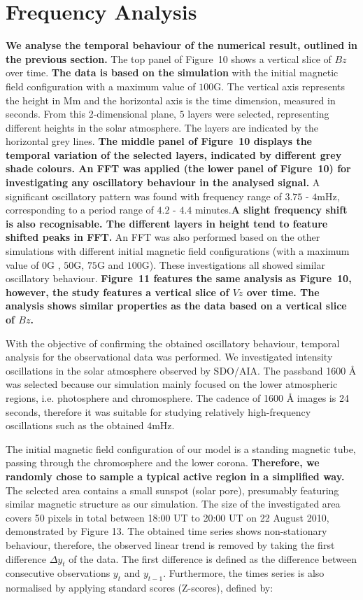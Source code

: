 \documentclass[physics,article,submit,pdftex,moreauthors]{Definitions/mdpi}
\begin{document}
\section{Frequency Analysis}

{\bf We analyse the temporal behaviour of the numerical result, outlined in the previous section.} The top panel of Figure~10 shows a vertical slice of $Bz$ over time. {\bf The data is based on the simulation} with the initial magnetic field configuration with a maximum value of $100$G. The vertical axis represents the height in Mm and the horizontal axis is the time dimension, measured in seconds. From this 2-dimensional plane, $5$ layers were selected, representing different heights in the solar atmosphere. The layers are indicated by the horizontal grey lines. {\bf  The middle panel of Figure~10 displays the temporal variation of the selected layers, indicated by different grey shade colours. An FFT was applied (the lower panel of Figure~10) for investigating any oscillatory behaviour in the analysed signal.} A significant oscillatory pattern was found with frequency range of $3.75$ - $4$mHz, corresponding to a period range of $4.2$ - $4.4$ minutes.{\bf A slight frequency shift is also recognisable. The different layers in height tend to feature shifted peaks in FFT.} An FFT was also performed based on the other simulations with different initial magnetic field configurations (with a maximum value of $0$G , $50$G,  $75$G  and $100$G). These investigations all showed similar oscillatory behaviour. {\bf Figure~11 features the same analysis as Figure~10, however, the study features a vertical slice of $Vz$ over time. The analysis shows similar properties as the data based on a vertical slice of $Bz$.}

With the objective of confirming the obtained oscillatory behaviour, temporal analysis for the observational data was performed. We investigated intensity oscillations in the solar atmosphere observed by SDO/AIA. The passband 1600 {\AA} was selected because our simulation mainly focused on the lower atmospheric regions, i.e. photosphere and chromosphere. The cadence of 1600 {\AA} images is 24 seconds, therefore it was suitable for studying relatively high-frequency oscillations such as the obtained $4$mHz.

The initial magnetic field configuration of our model is a standing magnetic tube, passing through the chromosphere and the lower corona. {\bf Therefore, we randomly chose to sample a typical active region in a simplified way.} The  selected area contains a small sunspot (solar pore), presumably featuring similar magnetic structure as our simulation. The size of the investigated area covers 50 pixels in total between 18:00 UT to 20:00 UT on 22 August 2010, demonstrated by Figure 13. The obtained time series shows non-stationary behaviour, therefore, the observed linear trend is removed by taking the first difference $\Delta  y_{t}$ of the data. The first difference is defined as the difference between consecutive observations $y_{t}$ and $y_{t-1}$. Furthermore, the times series is also normalised by applying standard scores (Z-scores), defined by:
\end{document}
